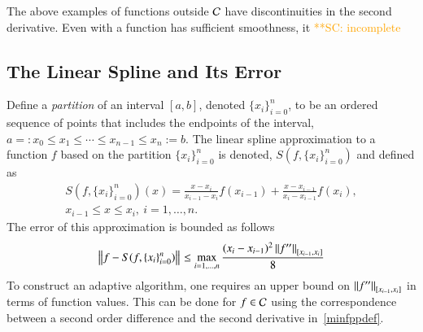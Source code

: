 \documentclass[review]{elsarticle}
\newcommand{\datasites}{\{x_i\}_{i=0}^n}
\theoremstyle{definition}
\newcommand{\scnote}[1]{ {\textcolor{orange}  {\mbox{**SC:} #1}}}
\begin{document}
The above examples of functions outside $\cc$ have discontinuities in the second
derivative. Even with a function has sufficient smoothness, it \scnote{incomplete}

\subsection{The Linear Spline and Its Error}

Define a \emph{partition} of an interval $[a, b]$, denoted $\datasites$, to be
an ordered sequence of points that includes the endpoints of the interval,
$a=:x_0 \le x_1 \le \cdots \le x_{n-1} \le x_{n}:=b$. The linear spline
approximation to a function $f$ based on the partition $\datasites$ is denoted,
$S(f,\datasites)$ and defined as
\begin{multline} \label{splinedef}
S(f,\datasites)(x) =  \frac{x-x_i}{x_{i-1} - x_i} f(x_{i-1}) + \frac{x-x_{i-1}}{x_{i} - x_{i-1}}f(x_i), \\ x_{i-1} \le x \le x_i, \ i=1, \ldots, n.
\end{multline}
The error of this approximation is bounded as follows
\begin{equation} \label{appxerrbda}
\norm{f - S(f,\datasites)} \le \max_{i=1, \ldots, n} \frac{(x_i - x_{i-1})^2\norm[{[x_{i-1},x_i]}]{f''}}{8}
\end{equation}
To construct an adaptive algorithm, one requires an upper bound on
$\norm[{[x_{i-1},x_i]}]{f''}$ in terms of function values. This can be done for
$f \in \cc$ using the correspondence between a second order difference and the
second derivative in~\eqref{minfppdef}.
\end{document}
